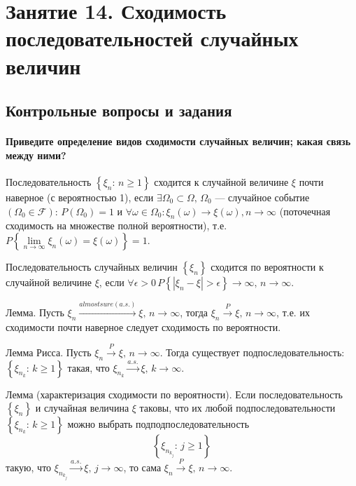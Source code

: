 \chapter*{Занятие 14. Сходимость последовательностей случайных величин}

\section*{Контрольные вопросы и задания}

\subsubsection*{Приведите определение видов сходимости случайных величин; какая связь между ними?}

Последовательность $ \left\{ \xi_n: \, n \geq 1 \right\} $ сходится к случайной величине $ \xi $ почти наверное (с вероятностью 1),
если $ \exists \Omega_0 \subset \Omega, \, \Omega_0 $ ---
случайное событие $ \left( \Omega_0 \in \mathcal{F} \right): \, P \left( \Omega_0 \right) = 1$ и
$ \forall \omega \in \Omega_0:
\xi_n \left( \omega \right) \rightarrow \xi \left( \omega \right),
n \rightarrow \infty $
(поточечная сходимость на множестве полной вероятности), т.е. $P \left\{ \lim \limits_{n \to \infty} \xi_n \left( \omega \right) = \xi \left( \omega \right) \right\} = 1$.

Последовательность случайных величин $ \left\{ \xi_n \right\} $ сходится по вероятности к случайной величине $ \xi $,
если $ \forall \epsilon > 0 \, P \left\{ \left| \xi_n - \xi \right| > \epsilon \right\} \rightarrow \infty, \, n \rightarrow \infty $.

Лемма.
Пусть $ \xi_n \overset{almost sure (a.s.)}{ \rightarrow } \xi, \, n \rightarrow \infty $, тогда $ \xi_n \overset{P}{ \rightarrow } \xi, \, n \rightarrow \infty $,
т.е. их сходимости почти наверное следует сходимость по вероятности.

Лемма Рисса.
Пусть $ \xi_n \overset{P}{ \rightarrow } \xi, \, n \rightarrow \infty $.
Тогда существует подпоследовательность: $ \left\{ \xi_{n_k}: \, k \geq 1 \right\} $ такая, что $ \xi_{n_k} \overset{a.s.}{ \rightarrow } \xi, \, k \rightarrow \infty $.

Лемма (характеризация сходимости по вероятности).
Если последовательность $ \left\{ \xi_n \right\} $ и случайная величина $ \xi $ таковы,
что их любой подпоследовательности $ \left\{ \xi_{n_k}: \, k \geq 1 \right\} $ можно выбрать подподпоследовательность
$$ \left\{ \xi_{n_{k_j}}: \, j \geq 1 \right\} $$
такую,
что $ \xi_{n_{k_j}} \overset{a.s.}{ \rightarrow } \xi, \, j \rightarrow \infty $, то сама $ \xi_n \overset{P}{ \rightarrow } \xi, \, n \rightarrow \infty $.

